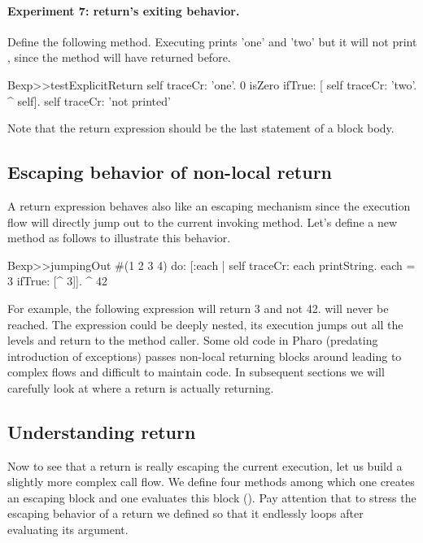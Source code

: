 \documentclass[a4paper,10pt,twoside]{book}
\begin{document}
\paragraph{Experiment 7: return's exiting behavior.}
Define the following method. Executing   prints 'one' and 'two' but it will not print , since the method  will have returned before.

\begin{code}{}
Bexp>>testExplicitReturn
	self traceCr: 'one'.
	0 isZero ifTrue: [ self traceCr: 'two'. ^ self].
	self traceCr: 'not printed'
\end{code}

Note that the return expression should be the last statement of a block body.

%
%


\subsection{Escaping behavior of non-local return}
A return expression behaves also like an escaping mechanism since the execution flow will directly jump out to the current invoking method. Let's define a new method  as follows to illustrate this behavior.

\begin{code}{}
Bexp>>jumpingOut
	#(1 2 3 4) do: [:each |
					self traceCr: each printString.
					each = 3
						ifTrue: [^ 3]].
	^ 42
\end{code}


For example, the following expression  will return 3 and not 42.  will never be reached. The expression \ct{[ ^3 ]} could be deeply nested, its execution jumps out all the levels and return to the method caller. Some old code in Pharo (predating introduction of exceptions) passes non-local returning blocks around leading to complex flows and difficult to maintain code. In subsequent sections we will carefully look at where a return is actually returning.

\subsection{Understanding return}
Now to see that a return is really escaping the current execution, let us build a slightly more complex call flow. We define four methods among which one creates an escaping block  and one evaluates this block (). Pay attention that to stress the escaping behavior of a return we defined  so that it endlessly loops after evaluating its argument.
\end{document}
